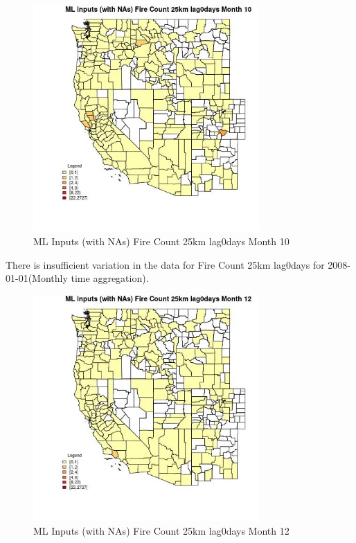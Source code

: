 \begin{figure} 
\centering  
\includegraphics[width=0.77\textwidth]{Code_Outputs/Report_ML_input_PM25_Step4_part_f_de_duplicated_aveswNAs_CountyFire_Count_25km_lag0daysmedianMonth10.jpg} 
\caption{\label{fig:Report_ML_input_PM25_Step4_part_f_de_duplicated_aveswNAsCountyFire_Count_25km_lag0daysmedianMonth10}ML Inputs (with NAs) Fire Count 25km lag0days Month 10} 
\end{figure} 
 

There is insufficient variation in the data for Fire Count 25km lag0days for 2008-01-01(Monthly time aggregation). 
 

\begin{figure} 
\centering  
\includegraphics[width=0.77\textwidth]{Code_Outputs/Report_ML_input_PM25_Step4_part_f_de_duplicated_aveswNAs_CountyFire_Count_25km_lag0daysmedianMonth12.jpg} 
\caption{\label{fig:Report_ML_input_PM25_Step4_part_f_de_duplicated_aveswNAsCountyFire_Count_25km_lag0daysmedianMonth12}ML Inputs (with NAs) Fire Count 25km lag0days Month 12} 
\end{figure} 
 

